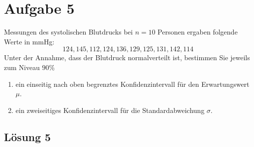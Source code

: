 \documentclass[main.tex]{subfiles}
\begin{document}
\section{Aufgabe 5}
Messungen des systolischen Blutdrucks bei $n = 10$ Personen ergaben folgende Werte in mmHg:
$$ 124, 145, 112, 124, 136, 129, 125, 131, 142, 114 $$
Unter der Annahme, dass der Blutdruck normalverteilt ist, bestimmen Sie jeweils zum Niveau $90\%$
\begin{enumerate}
	\item ein einseitig nach oben begrenztes Konfidenzintervall für den Erwartungswert $\mu$.
	\item ein zweiseitiges Konfidenzintervall für die Standardabweichung $\sigma$.
\end{enumerate}

\subsection{Lösung 5}
\end{document}
